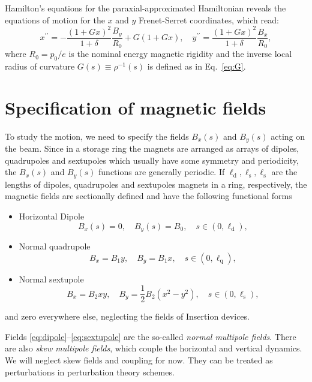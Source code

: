 Hamilton's equations for the paraxial-approximated Hamiltonian reveals the equations of motion for the $x$ and $y$ Frenet-Serret coordinates, which read:
\begin{equation}
x^{\prime \prime}=-\frac{(1+G x)^{2}}{1+\delta} \frac{B_{y}}{R_0}+G(1+G x),
\quad
y^{\prime \prime}=\frac{(1+G x)^{2}}{1+\delta} \frac{B_{x}}{R_0},
\label{eq:EOMs}
\end{equation}
where $R_0 = p_0/e$ is the nominal energy magnetic rigidity and the inverse local radius of curvature $G(s)\equiv\rho^{-1}(s)$ is defined as in Eq.~\eqref{eq:G}.
\section{Specification of magnetic fields}
To study the motion, we need to specify the fields $B_x(s)$ and $B_y(s)$ acting on the beam. Since in a storage ring the magnets are arranged as arrays of dipoles, quadrupoles and sextupoles which usually have some symmetry and periodicity, the $B_x(s)$ and $B_y(s)$ functions are generally periodic. If $\ell_{\text{d}}, \ell_{\text{s}}, \ell_{\text{s}}$ are the lengths of dipoles, quadrupoles and sextupoles magnets in a ring, respectively, the magnetic fields are sectionally defined and have the following functional forms
\begin{itemize}
    \item Horizontal Dipole
           \begin{equation} B_x(s) = 0, \quad B_y(s) = B_0, \quad s\in(0,\ell_{\text{d}}),
            \label{eq:dipole}
           \end{equation}
    \item Normal quadrupole
          \begin{equation}B_x = B_1 y, \quad B_y = B_1 x, \quad s\in(0,\ell_{\text{q}}),
            \label{eq:quadrupole}
           \end{equation}
    \item Normal sextupole
          \begin{equation}B_x = B_2xy, \quad B_y = \frac{1}{2}B_2(x^2 - y^2), \quad s\in(0,\ell_{\text{s}}),
            \label{eq:sextupole}
           \end{equation}
\end{itemize}
and zero everywhere else, neglecting the fields of Insertion devices.

Fields \eqref{eq:dipole}--\eqref{eq:sextupole}  are the so-called \textit{normal multipole fields}. There are also \textit{skew multipole fields}, which couple the horizontal and vertical dynamics. We will neglect skew fields and coupling for now. They can be treated as perturbations in perturbation theory schemes.

